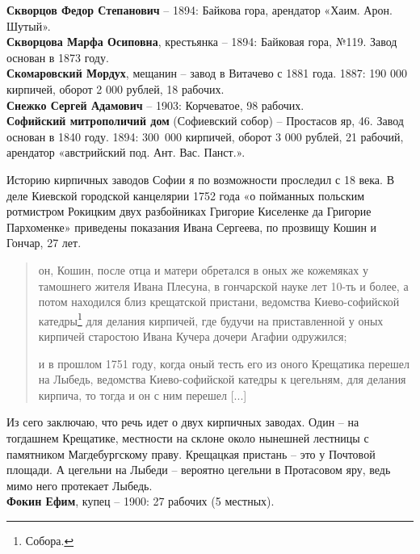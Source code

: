 \noindent\textbf{Скворцов Федор Степанович} – 1894: Байкова гора, арендатор «Хаим. Арон. Шутый».\\

\noindent\textbf{Скворцова Марфа Осиповна}, крестьянка – 1894: Байковая гора, №119. Завод основан в 1873 году.\\

\noindent\textbf{Скомаровский Мордух}, мещанин – завод в Витачево с 1881 года. 1887: 190 000 кирпичей, оборот 2 000 рублей, 18 рабочих.\\

\noindent\textbf{Снежко Сергей Адамович} – 1903: Корчеватое, 98 рабочих.\\

\noindent\textbf{Софийский митрополичий дом} (Софиевский собор) – Простасов яр, 46. Завод основан в 1840 году. 1894: \mbox{300 000} кирпичей, оборот 3 000 рублей, 21 рабочий, арендатор «австрийский под. Ант. Вас. Панст.».

Историю кирпичных заводов Софии я по возможности проследил с 18 века. В деле Киевской городской канцелярии 1752 года «о пойманных польским ротмистром Рокицким двух разбойниках Григорие Киселенке да Григорие Пархоменке» приведены показания Ивана Сергеева, по прозвищу Кошин и Гончар, 27 лет. 

\begin{quotation}
он, Кошин,  после отца и матери обретался в оных же кожемяках у тамошнего жителя Ивана Плесуна, в гончарской науке лет 10-ть и более, а потом находился близ крещатской пристани, ведомства Киево-софийской катедры\footnote{Собора.} для делания кирпичей, где будучи на приставленной у оных кирпичей старостою Ивана Кучера дочери Агафии одружился; 

и в прошлом 1751 году, когда оный тесть его из оного Крещатика перешел на Лыбедь, ведомства Киево-софийской катедры к цегельням, для делания кирпича, то тогда и он с ним перешел [...]
\end{quotation} 

Из сего заключаю, что речь идет о двух кирпичных заводах. Один – на тогдашнем Крещатике, местности на склоне около нынешней лестницы с памятником Магдебургскому праву. Крещацкая пристань – это у Почтовой площади. А цегельни на Лыбеди – вероятно цегельни в Протасовом яру, ведь мимо него протекает Лыбедь.\\

\noindent\textbf{Фокин Ефим}, купец – 1900: 27 рабочих (5 местных).\\

